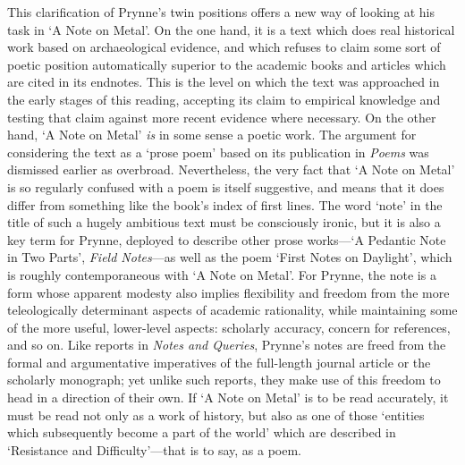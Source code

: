 \documentclass[]{article}
\begin{document}
This clarification of Prynne’s twin positions offers a new way of
looking at his task in ‘A Note on Metal’. On the one hand, it is a text
which does real historical work based on archaeological evidence, and
which refuses to claim some sort of poetic position automatically
superior to the academic books and articles which are cited in its
endnotes. This is the level on which the text was approached in the
early stages of this reading, accepting its claim to empirical knowledge
and testing that claim against more recent evidence where necessary. On
the other hand, ‘A Note on Metal’ \emph{is} in some sense a poetic work.
The argument for considering the text as a ‘prose poem’ based on its
publication in \emph{Poems} was dismissed earlier as overbroad.
Nevertheless, the very fact that ‘A Note on Metal’ is so regularly
confused with a poem is itself suggestive, and means that it does differ
from something like the book’s index of first lines. The word ‘note’ in
the title of such a hugely ambitious text must be consciously ironic,
but it is also a key term for Prynne, deployed to describe other prose
works—‘A Pedantic Note in Two Parts’, \emph{Field Notes}—as well as the
poem ‘First Notes on Daylight’, which is roughly contemporaneous with ‘A
Note on Metal’. For Prynne, the note is a form whose apparent modesty
also implies flexibility and freedom from the more teleologically
determinant aspects of academic rationality, while maintaining some of
the more useful, lower-level aspects: scholarly accuracy, concern for
references, and so on. Like reports in \emph{Notes and Queries},
Prynne’s notes are freed from the formal and argumentative imperatives
of the full-length journal article or the scholarly monograph; yet
unlike such reports, they make use of this freedom to head in a
direction of their own. If ‘A Note on Metal’ is to be read accurately,
it must be read not only as a work of history, but also as one of those
‘entities which subsequently become a part of the world’ which are
described in ‘Resistance and Difficulty’—that is to say, as a poem.
\end{document}
